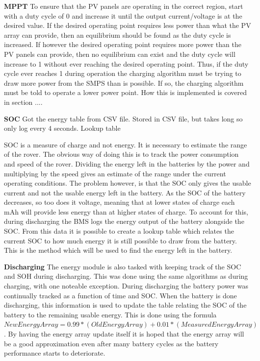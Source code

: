 \documentclass[a4paper]{article}
\begin{document}
\textbf{MPPT}
\vspace{10pt} 
\newline
To ensure that the PV panels are operating in the correct region, start with a duty
cycle of 0 and increase it until the output current/voltage is at the desired value.
If the desired operating point requires less power than what the PV array can provide,
then an equilibrium should be found as the duty cycle is increased. If however the 
desired operating point requires more power than the PV panels can provide, then no 
equilibrium can exist and the duty cycle will increase to 1 without ever reaching the
desired operating point. Thus, if the duty cycle ever reaches 1 during operation
the charging algorithm must be trying to draw more power from the SMPS than is 
possible. If so, the charging algorithm must be told to operate a lower power point. How this
is implemented is covered in section ....


\textbf{SOC}
\vspace{10pt} 
\newline
Got the energy table from CSV file.
Stored in CSV file, but takes long so only log every 4 seconds.
Lookup table

SOC is a measure of charge and not energy. It is necessary to estimate 
the range of the rover. The obvious way of doing this is to track the 
power consumption and speed of the rover. Dividing the energy left in 
the batteries by the power and multiplying by the speed gives an estimate 
of the range under the current operating conditions. The problem however, 
is that the SOC only gives the usable current and not the usable energy 
left in the battery. As the SOC of the battery decreases, so too does it 
voltage, meaning that at lower states of charge each mAh will provide less 
energy than at higher states of charge. To account for this, during discharging 
the BMS logs the energy output of the battery alongside the SOC. From this data 
it is possible to create a lookup table which relates the current SOC to how 
much energy it is still possible to draw from the battery. This is the method 
which will be used to find the energy left in the battery.

\textbf{Discharging}
\vspace{10pt} 
\newline
The energy module is also tasked with keeping track of the SOC and SOH during discharging.
This was done using the same algorithms as during charging, with one noteable exception.
During discharging the battery power was continually tracked as a function of time and
SOC. When the battery is done discharging, this information is used to update the table
relating the SOC of the battery to the remaining usable energy. This is done using the
formula \( New Energy Array = 0.99*(Old Energy Array) + 0.01*(Measured Energy Array) \). 
By having the energy array update itself it is hoped that the energy array will be a good
approximation even after many battery cycles as the battery performance starts to deteriorate.
\end{document}
